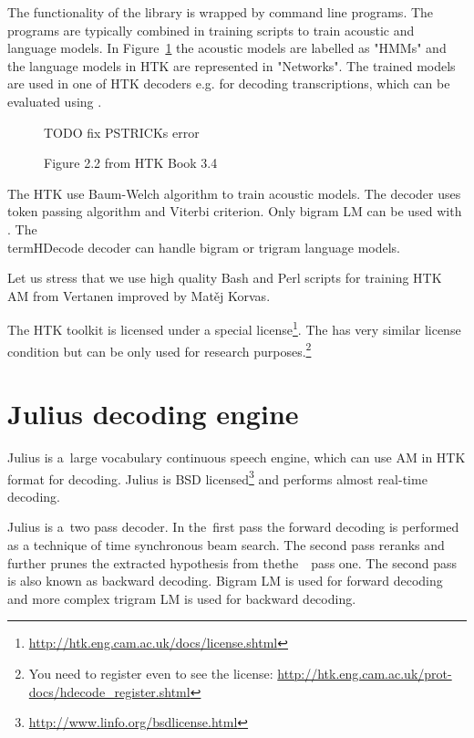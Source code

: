 {The functionality of the library is wrapped by command line programs.
The programs are typically combined in training scripts to train acoustic and language models.
In Figure~\ref{fig:htk_tools} the acoustic models are labelled as "HMMs" 
and the language models in \ac{HTK} are represented in "Networks".
The trained models are used in one of \ac{HTK} decoders e.g.  for decoding
transcriptions, which can be evaluated using .

\begin{figure}[!htp]
    \begin{center}
    TODO fix PSTRICKs error
    \caption{Figure 2.2 from HTK Book 3.4\cite{young2006htk}}
    \label{fig:htk_tools} 
    \end{center}
\end{figure}

The \ac{HTK} use Baum-Welch algorithm to train acoustic models.
The  decoder uses token passing algorithm and Viterbi criterion.
\cite{HTKBook3.4} %
Only bigram \ac{LM} can be used with .
The \\term{HDecode} decoder can handle bigram or trigram language models. 


Let us stress that we use high quality Bash and Perl scripts for training \ac{HTK} \ac{AM}
from Vertanen improved by Matěj Korvas.\cite{vertanen_baseline_2006}\cite{korvas_2014}

The \ac{HTK} toolkit is licensed under a special license\footnote{\url{http://htk.eng.cam.ac.uk/docs/license.shtml}}.
The  has very similar license condition but can be only used for research purposes.\footnote{You
need to register even to see the license: \url{http://htk.eng.cam.ac.uk/prot-docs/hdecode_register.shtml}}

\section{Julius decoding engine}
\label{sec:back_julius}

Julius is a~large vocabulary continuous speech engine, which can use \ac{AM} in \ac{HTK} format for decoding.\cite{lee2009julius}
Julius is BSD licensed\footnote{\url{http://www.linfo.org/bsdlicense.html}} and performs almost real-time decoding.

Julius is a~two pass decoder. In the~first pass the forward decoding is performed as
a technique of time synchronous beam search.
The second pass reranks and further prunes the extracted hypothesis from thethe~~pass one.
The second pass is also known as backward decoding.
Bigram \ac{LM} is used for forward decoding and more complex trigram \ac{LM} is used for backward decoding.

}

